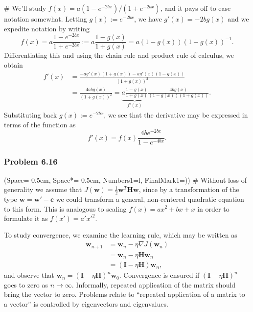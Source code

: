\documentclass[12pt, a4paper]{article}
\newcommand{\listSpace}{-0.5em}%
\newcommand{\vect}[1]{\bm{#1}}
\begin{document}
{\begin{easylist}[enumerate]
	# We'll study $f(x) = a (1 - e^{-2bx}) / (1 + e^{-2bx})$, and it pays off to ease notation somewhat.
	Letting $g(x) := e^{-2bx}$, we have $g'(x) = -2b g(x)$ and we expedite notation by writing
	\begin{equation*}
		f(x) = a \frac{1 - e^{-2bx}}{1 + e^{-2bx}} :=
		a \frac{1 - g(x)}{1 + g(x)} =  a (1 - g(x)) (1 + g(x))^{-1}.
	\end{equation*}
	Differentiating this and using the chain rule and product rule of calculus, we obtain
	\begin{align*}
		f'(x) &=  \frac{-a g'(x) (1 + g(x)) - ag'(x) (1 - g(x))}{(1 + g(x))^2} \\
		&= \frac{4 ab g(x)}{(1 + g(x))^2} = \underbrace{a \frac{1 - g(x)}{1 + g(x)}}_{f'(x)} \frac{4bg(x)}{(1 - g(x)) (1 + g(x))}.
	\end{align*}
	Substituting back $g(x) := e^{-2bx}$, we see that  the derivative may be expressed in terms of the function as
	\begin{equation*}
		f'(x) = f(x) \frac{4 b  e^{-2bx}}{1 - e^{-4bx}}.
	\end{equation*}
\end{easylist}


\subsubsection*{Problem 6.16}
\begin{easylist}[enumerate]
\ListProperties(Space=\listSpace, Space*=\listSpace, Numbers1=l, FinalMark1={)})
# Without loss of generality we assume that $J(\vect{w}) = \frac{1}{2}\vect{w}^T \vect{H} \vect{w}$, since by a transformation of the type $\vect{w} = \vect{w}' - \vect{c}$ we could transform a general, non-centered quadratic equation to this form.
This is analogous to scaling $f(x) = a x^2 + bx + x$ in order to formulate it as $f(x') = a' x'^2$.

To study convergence, we examine the learning rule, which may be written as
\begin{align*}
	\vect{w}_{n+1} &= \vect{w}_{n} - \eta \nabla J(\vect{w}_{n}) \\
	&= \vect{w}_{n} - \eta  \vect{H} \vect{w}_{n} \\
	&=  \left( \vect{I} - \eta  \vect{H} \right) \vect{w}_{n},
\end{align*}
and observe that $\vect{w}_{n} = \left( \vect{I} - \eta  \vect{H} \right)^n \vect{w}_{0}$.
Convergence is ensured if $\left( \vect{I} - \eta  \vect{H} \right)^n$ goes to zero as $n \to \infty$.
Informally, repeated application of the matrix should bring the vector to zero.
Problems relate to ``repeated application of a matrix to a vector'' is controlled by eigenvectors and eigenvalues.


\end{easylist}}
\end{document}
